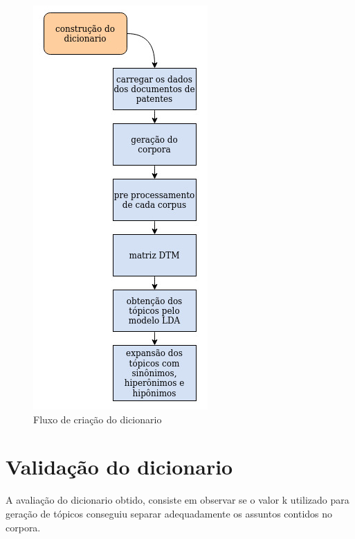 \begin{figure}[ht!]
	\centering
	\includegraphics[scale=0.5]{imagens/tcc_dicionario.jpg}
	\caption{Fluxo de criação do dicionario
			 \label{dicionario_flow_image}}
\end{figure}

\section{Validação do dicionario}
A avaliação do dicionario obtido, consiste em observar se o valor k utilizado para geração de tópicos conseguiu separar adequadamente os assuntos contidos no corpora.



